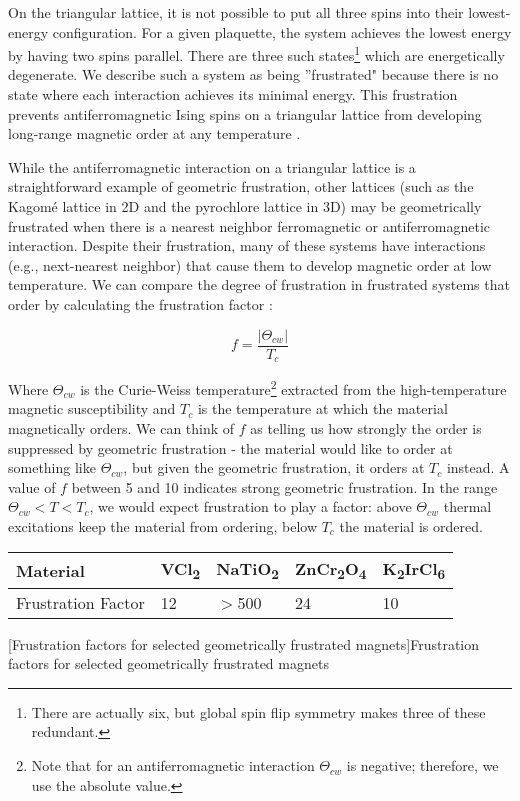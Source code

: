 On the triangular lattice, it is not possible to put all three spins into their lowest-energy configuration. For a given plaquette, the system achieves the lowest energy by having two spins parallel. There are three such states\footnote{There are actually six, but global spin flip symmetry makes three of these redundant.} which are energetically degenerate. We describe such a system as being ''frustrated" because there is no state where each interaction achieves its minimal energy. This frustration prevents antiferromagnetic Ising spins on a triangular lattice from developing long-range magnetic order at any temperature \cite{Wannier1950}.

While the antiferromagnetic interaction on a triangular lattice is a straightforward example of geometric frustration, other lattices (such as the Kagom{\'e} lattice in 2D and the pyrochlore lattice in 3D) may be geometrically frustrated when there is a nearest neighbor ferromagnetic or antiferromagnetic interaction. Despite their frustration, many of these systems have interactions (e.g., next-nearest neighbor) that cause them to develop magnetic order at low temperature. We can compare the degree of frustration in frustrated systems that order by calculating the frustration factor \cite{Ramirez1994}:

\begin{equation}
f = \frac{|\Theta_{cw}|}{T_{c}}
\end{equation}

Where $\Theta_{cw}$ is the Curie-Weiss temperature\footnote{Note that for an antiferromagnetic interaction $\Theta_{cw}$ is negative; therefore, we use the absolute value.} extracted from the high-temperature magnetic susceptibility and $T_{c}$ is the temperature at which the material magnetically orders. We can think of $f$ as telling us how strongly the order is suppressed by geometric frustration - the material would like to order at something like $\Theta_{cw}$, but given the geometric frustration, it orders at $T_{c}$ instead. A value of $f$ between 5 and 10 indicates strong geometric frustration. In the range $\Theta_{cw} < T < T_{c}$, we would expect frustration to play a factor: above $\Theta_{cw}$ thermal excitations keep the material from ordering, below $T_{c}$ the material is ordered.

\begin{center}
	\begin{tabular}{l | l | l | l | l}
		\hline
		\hline
		Material & VCl\textsubscript{2} & NaTiO\textsubscript{2} & ZnCr\textsubscript{2}O\textsubscript{4} & K\textsubscript{2}IrCl\textsubscript{6}\\ \hline
		Frustration Factor & 12 & $>$500 & 24 & 10\\ \hline \hline
	\end{tabular}
	[Frustration factors for selected geometrically frustrated magnets]{Frustration factors for selected geometrically frustrated magnets \cite{Ramirez1994}}\label{tbl:frustratedmagens}
\end{center}

